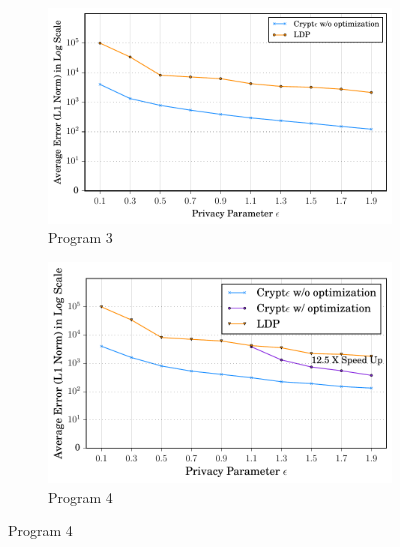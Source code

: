 \begin{figure}[ht]
    \begin{subfigure}[b]{0.25\linewidth}
    \centering \includegraphics[width=1\linewidth]{t3.pdf}
        \caption{Program 3}
        \label{fig:mouse}\end{subfigure}%
          \begin{subfigure}[b]{0.25\linewidth}
    \centering  \includegraphics[width=1\linewidth]{t4.pdf}
        \caption{Program 4}
        \label{fig:mouse}\end{subfigure}%
        

\end{figure}
